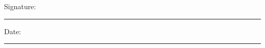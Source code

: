 \documentclass[12pt,oneside]{book}
\begin{document}
\noindent Signature:\\[1mm]
\rule[1em]{25em}{0.5pt}

\noindent Date:\\[1mm]
\rule[1em]{25em}{0.5pt}





\tableofcontents
\listoffigures
\listoftables


\mainmatter










\end{document}
